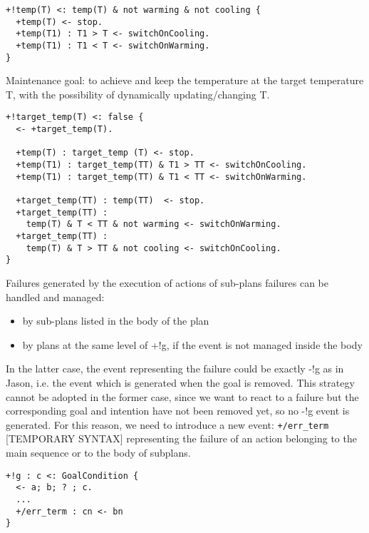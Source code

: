 {\small
\begin{verbatim}
+!temp(T) <: temp(T) & not warming & not cooling {
  +temp(T) <- stop.		
  +temp(T1) : T1 > T <- switchOnCooling.	
  +temp(T1) : T1 < T <- switchOnWarming.		
}\end{verbatim}}


\noindent Maintenance goal: to achieve and keep the temperature at the target temperature T, with the possibility of dynamically updating/changing T.

{\small
\begin{verbatim}
+!target_temp(T) <: false {
  <- +target_temp(T).	
 
  +temp(T) : target_temp (T) <- stop.		
  +temp(T1) : target_temp(TT) & T1 > TT <- switchOnCooling.	  
  +temp(T1) : target_temp(TT) & T1 < TT <- switchOnWarming.
 
  +target_temp(TT) : temp(TT)  <- stop.	
  +target_temp(TT) : 
    temp(T) & T < TT & not warming <- switchOnWarming.
  +target_temp(TT) : 
    temp(T) & T > TT & not cooling <- switchOnCooling.
}
\end{verbatim}}


Failures generated by the execution of actions of sub-plans failures can be handled and managed:

\begin{itemize}
\item by sub-plans listed in the body of the plan
\item by plans at the same level of +!g, if the event is not managed inside the body
\end{itemize}

\noindent In the latter case, the event representing the failure could be exactly -!g as in Jason, i.e. the event which is generated when the goal is removed.
%
This strategy cannot be adopted in the former case, since we want to react to a failure but the corresponding goal and intention have not been removed yet, so no -!g event is generated. For this reason, we need to introduce a new event:  \texttt{+/err\_term}  [TEMPORARY SYNTAX]  representing the failure of an action belonging to the main sequence or to the body of subplans.  

{\small
\begin{verbatim}
+!g : c <: GoalCondition {
  <- a; b; ? ; c. 
  ...
  +/err_term : cn <- bn
}
\end{verbatim}}

